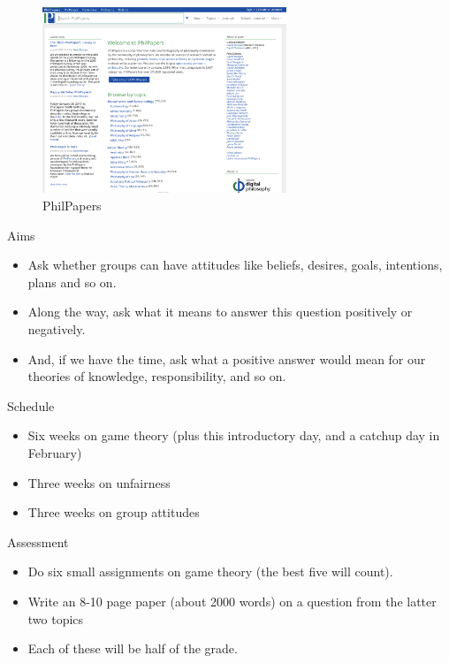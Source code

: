 \documentclass[
  ignorenonframetext,
]{beamer}
\providecommand{\tightlist}{%
  \setlength{\itemsep}{0pt}\setlength{\parskip}{0pt}}
\begin{document}
\begin{frame}
\begin{figure}
\centering
\includegraphics[width=0.65\textwidth,height=0.65\textheight]{images/phil_papers.png}
\caption{PhilPapers}
\end{figure}
\end{frame}

\begin{frame}{Aims}
\protect\hypertarget{aims-2}{}
\begin{itemize}
\tightlist
\item
  Ask whether groups can have attitudes like beliefs, desires, goals,
  intentions, plans and so on.
\item
  Along the way, ask what it means to answer this question positively or
  negatively.
\item
  And, if we have the time, ask what a positive answer would mean for
  our theories of knowledge, responsibility, and so on.
\end{itemize}
\end{frame}

\begin{frame}{Schedule}
\protect\hypertarget{schedule}{}
\begin{itemize}
\tightlist
\item
  Six weeks on game theory (plus this introductory day, and a catchup
  day in February)
\item
  Three weeks on unfairness
\item
  Three weeks on group attitudes
\end{itemize}
\end{frame}

\begin{frame}{Assessment}
\protect\hypertarget{assessment}{}
\begin{itemize}[<+->]
\tightlist
\item
  Do six small assignments on game theory (the best five will count).
\item
  Write an 8-10 page paper (about 2000 words) on a question from the
  latter two topics
\item
  Each of these will be half of the grade.
\end{itemize}
\end{frame}
\end{document}
